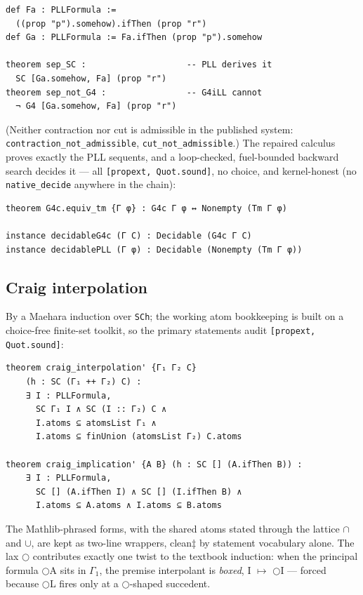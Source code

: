 \begin{lstlisting}
def Fa : PLLFormula :=
  ((prop "p").somehow).ifThen (prop "r")
def Ga : PLLFormula := Fa.ifThen (prop "p").somehow

theorem sep_SC :                    -- PLL derives it
  SC [Ga.somehow, Fa] (prop "r")
theorem sep_not_G4 :                -- G4iLL cannot
  ¬ G4 [Ga.somehow, Fa] (prop "r")
\end{lstlisting}

\noindent (Neither contraction nor cut is admissible in the published
system: \texttt{contraction\_not\_admissible},
\texttt{cut\_not\_admissible}.) The repaired calculus proves exactly the
PLL sequents, and a loop-checked, fuel-bounded backward search decides
it — all \texttt{[propext, Quot.sound]}, no choice, and kernel-honest
(no \texttt{native\_decide} anywhere in the chain):

\begin{lstlisting}
theorem G4c.equiv_tm {Γ φ} : G4c Γ φ ↔ Nonempty (Tm Γ φ)

instance decidableG4c (Γ C) : Decidable (G4c Γ C)
instance decidablePLL (Γ φ) : Decidable (Nonempty (Tm Γ φ))
\end{lstlisting}

\subsection{Craig interpolation}\label{app:craig}

By a Maehara induction over \texttt{SCh}; the working atom bookkeeping
is built on a choice-free finite-set toolkit, so the primary statements
audit \texttt{[propext, Quot.sound]}:

\begin{lstlisting}
theorem craig_interpolation' {Γ₁ Γ₂ C}
    (h : SC (Γ₁ ++ Γ₂) C) :
    ∃ I : PLLFormula,
      SC Γ₁ I ∧ SC (I :: Γ₂) C ∧
      I.atoms ⊆ atomsList Γ₁ ∧
      I.atoms ⊆ finUnion (atomsList Γ₂) C.atoms

theorem craig_implication' {A B} (h : SC [] (A.ifThen B)) :
    ∃ I : PLLFormula,
      SC [] (A.ifThen I) ∧ SC [] (I.ifThen B) ∧
      I.atoms ⊆ A.atoms ∧ I.atoms ⊆ B.atoms
\end{lstlisting}

\noindent The Mathlib-phrased forms, with the shared atoms stated
through the lattice \ensuremath{\cap} and \ensuremath{\cup}, are
kept as two-line wrappers, clean‡ by statement vocabulary alone. The
lax \ensuremath{\bigcirc} contributes exactly one twist to the textbook
induction: when the principal formula \ensuremath{\bigcirc}A sits in
\ensuremath{\Gamma{}_{1}}, the premise interpolant is \emph{boxed},
I \ensuremath{\mapsto} \ensuremath{\bigcirc}I --- forced because \ensuremath{\bigcirc}L
fires only at a \ensuremath{\bigcirc}-shaped succedent.

